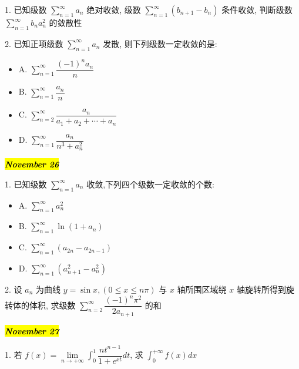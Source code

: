 1. 已知级数 $\sum\limits_{n=1}^{\infty}a_{n}$ 绝对收敛,
级数 $\sum\limits_{n=1}^{\infty}(b_{n+1}-b_{n})$ 条件收敛,
判断级数 $\sum\limits_{n=1}^{\infty}b_{n}a_{n}^{2}$ 的敛散性
\begin{solution}
	
\end{solution}
 
2. 已知正项级数 $\sum\limits_{n=1}^{\infty}a_{n}$ 发散, 则下列级数一定收敛的是:
\begin{itemize}
	\item A. $\sum\limits_{n=1}^{\infty}\dfrac{(-1)^{n}a_{n}}{n}$
	\item B. $\sum\limits_{n=1}^{\infty}\dfrac{a_{n}}{n}$
	\item C. $\sum\limits_{n=2}^{\infty}\dfrac{a_{n}}{a_{1}+a_{2}+\cdots+a_{n}}$
	\item D. $\sum\limits_{n=1}^{\infty}\dfrac{a_{n}}{n^{3}+a_{n}^{2}}$
\end{itemize}
\begin{solution}
	
\end{solution}

\hl{\textbf{\textit{November 26}}}

1. 已知级数 $\sum\limits_{n=1}^{\infty}a_{n}$ 收敛,下列四个级数一定收敛的个数:
\begin{itemize}
	\item A. $\sum\limits_{n=1}^{\infty}a_{n}^{2}$
	\item B. $\sum\limits_{n=1}^{\infty}\ln(1+a_{n})$
	\item C. $\sum\limits_{n=1}^{\infty}(a_{2n}-a_{2n-1})$
	\item D. $\sum\limits_{n=1}^{\infty}(a_{n+1}^{2}-a_{n}^{2})$
\end{itemize}
\begin{solution}
	
\end{solution}


2. 设 $a_{n}$ 为曲线 $y=\sin x,(0\leq x\leq n\pi)$ 与 $x$ 轴所围区域绕 $x$ 轴旋转所得到旋转体的体积,
求级数 $\sum\limits_{n=2}^{\infty}\dfrac{(-1)^{n}\pi^{2}}{2a_{n+1}}$ 的和
\begin{solution}
	
\end{solution}

\hl{\textbf{\textit{November 27}}}

1. 若 $\displaystyle{f(x)=\lim\limits_{n\rightarrow+\infty}\int_{0}^{1}\dfrac{nt^{n-1}}{1+e^{xt}}dt}$,
求 $\int_{0}^{+\infty}f(x)dx$
\begin{solution}
	
\end{solution}

